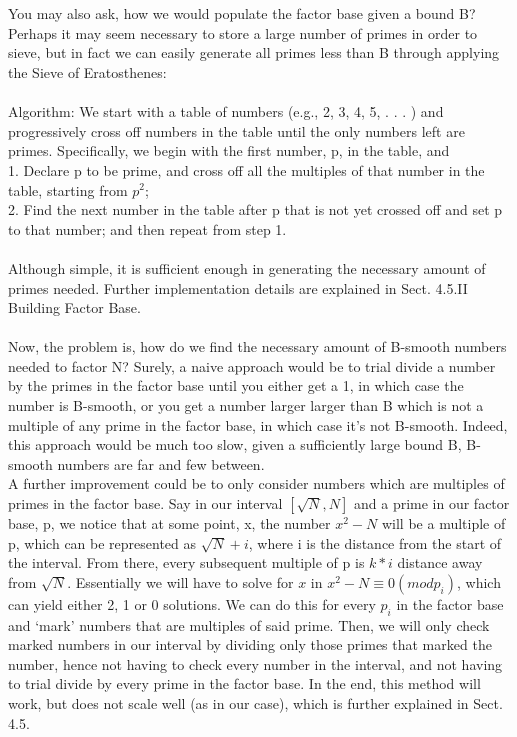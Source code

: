 \documentclass[12pt]{article} %
\begin{document}
	\\\\You may also ask, how we would populate the factor base given a bound B? Perhaps it may seem necessary to store a large number of primes in order to sieve, but in fact we can easily generate all primes less than B through applying the Sieve of Eratosthenes:
	\\\\Algorithm: We start with a table of numbers (e.g., 2, 3, 4, 5, . . . ) and progressively cross off numbers in the table until the only numbers left are primes. Specifically, we begin with the first number, p, in the table, and 
	\\1. Declare p to be prime, and cross off all the multiples of that number in the table, starting from $p^{2}$;
	\\2. Find the next number in the table after p that is not yet crossed off and set p to that number; and then repeat from step 1.
	\\\\Although simple, it is sufficient enough in generating the necessary amount of primes needed. Further implementation details are explained in Sect. 4.5.II Building Factor Base.
	\\\\Now, the problem is, how do we find the necessary amount of B-smooth numbers needed to factor N? Surely, a naive approach would be to trial divide a number by the primes in the factor base until you either get a 1, in which case the number is B-smooth, or you get a number larger larger than B which is not a multiple of any prime in the factor base, in which case it’s not B-smooth. Indeed, this approach would be much too slow, given a sufficiently large bound B, B-smooth numbers are far and few between.
	\\\indent A further improvement could be to only consider numbers which are multiples of primes in the factor base. Say in our interval $[\sqrt{N},N]$ and a prime in our factor base, p, we notice that at some point, x, the number $x^{2}-N$ will be a multiple of p, which can be represented as $\sqrt{N}+i$, where i is the distance from the start of the interval. From there, every subsequent multiple of p is $k*i$ distance away from $\sqrt{N}$. Essentially we will have to solve for $x$ in $x^{2}-N\equiv 0(mod p_i)$, which can yield either 2, 1 or 0 solutions. We can do this for every $p_i$ in the factor base and ‘mark’ numbers that are multiples of said prime. Then, we will only check marked numbers in our interval by dividing only those primes that marked the number, hence not having to check every number in the interval, and not having to trial divide by every prime in the factor base. In the end, this method will work, but does not scale well (as in our case), which is further explained in Sect. 4.5.
\end{document}

